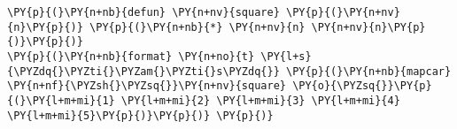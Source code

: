 \begin{Verbatim}[commandchars=\\\{\}]
\PY{p}{(}\PY{n+nb}{defun} \PY{n+nv}{square} \PY{p}{(}\PY{n+nv}{n}\PY{p}{)} \PY{p}{(}\PY{n+nb}{*} \PY{n+nv}{n} \PY{n+nv}{n}\PY{p}{)}\PY{p}{)}
\PY{p}{(}\PY{n+nb}{format} \PY{n+no}{t} \PY{l+s}{\PYZdq{}\PYZti{}\PYZam{}\PYZti{}s\PYZdq{}} \PY{p}{(}\PY{n+nb}{mapcar} \PY{n+nf}{\PYZsh{}\PYZsq{}}\PY{n+nv}{square} \PY{o}{\PYZsq{}}\PY{p}{(}\PY{l+m+mi}{1} \PY{l+m+mi}{2} \PY{l+m+mi}{3} \PY{l+m+mi}{4} \PY{l+m+mi}{5}\PY{p}{)}\PY{p}{)} \PY{p}{)}
\end{Verbatim}
